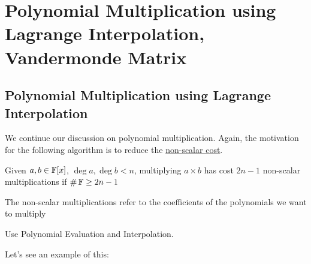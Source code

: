 
\section{Polynomial Multiplication using Lagrange Interpolation, Vandermonde Matrix}

\subsection{Polynomial Multiplication using Lagrange Interpolation}
We continue our discussion on polynomial multiplication.
Again, the motivation for the following algorithm is to reduce the \ul{non-scalar cost}.

\begin{theorem}{}{}
    Given $a,b \in \operatorname{\mathbb{F}}[x]$, $\deg a, \deg b < n$, multiplying $a \times b$ has cost $2n - 1$ non-scalar multiplications if $\#\operatorname{\mathbb{F}} \geq 2n - 1$
\end{theorem}
\begin{note}
    The non-scalar multiplications refer to the coefficients of the polynomials we want to multiply
\end{note}

\begin{idea}
Use Polynomial Evaluation and Interpolation.
\end{idea}
Let's see an example of this:

